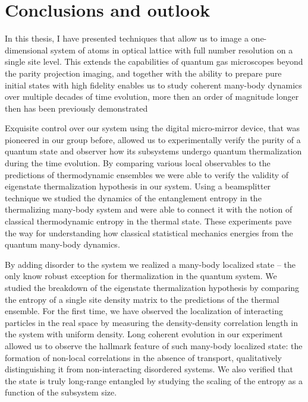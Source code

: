 
\chapter{Conclusions and outlook}

In this thesis, I have presented techniques that allow us to image a one-dimensional system of atoms in optical lattice with full number resolution on a single site level. This extends the capabilities of quantum gas microscopes beyond the parity projection imaging, and together with the ability to prepare pure initial states with high fidelity enables us to study coherent many-body dynamics over multiple decades of time evolution, more then an order of magnitude longer then has been previously demonstrated

Exquisite control over our system using the digital micro-mirror device, that was pioneered in our group before, allowed us to experimentally verify the purity of a quantum state and observer how its subsystems undergo quantum thermalization during the time evolution. By comparing various local observables to the predictions of thermodynamic ensembles we were able to verify the validity of eigenstate thermalization hypothesis in our system. Using a beamsplitter technique we studied the dynamics of the entanglement entropy in the thermalizing many-body system and were able to connect it with the notion of classical thermodynamic entropy in the thermal state. These experiments pave the way for understanding how classical statistical mechanics energies from the quantum many-body dynamics.

By adding disorder to the system we realized a many-body localized state -- the only know robust exception for thermalization in the quantum system. We studied the breakdown of the eigenstate thermalization hypothesis by comparing the entropy of a single site density matrix to the predictions of the thermal ensemble. For the first time, we have observed the localization of interacting particles in the real space by measuring the density-density correlation length in the system with uniform density. Long coherent evolution in our experiment allowed us to observe the hallmark feature of such many-body localized state: the formation of non-local correlations in the absence of transport, qualitatively distinguishing it from non-interacting disordered systems. We also verified that the state is truly long-range entangled by studying the scaling of the entropy as a function of the subsystem size.

